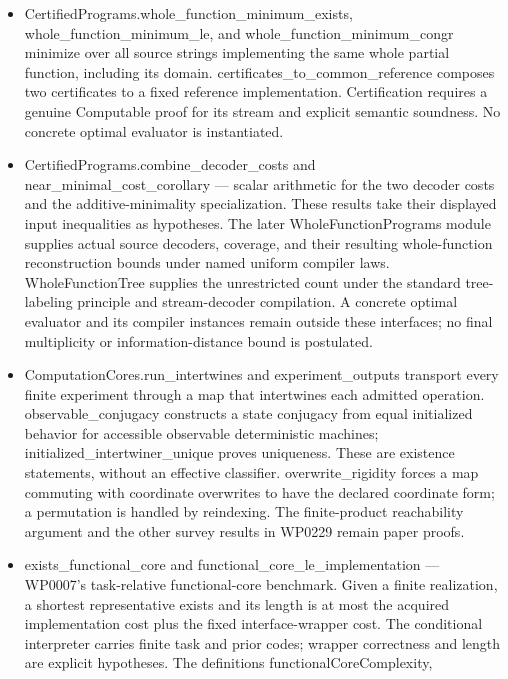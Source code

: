 \documentclass[11pt,a4paper]{article}
\newcommand{\lean}[1]{{\ttfamily\small
  \let\leanunderscore\_\def\_{\leanunderscore\allowbreak}#1}}
\begin{document}
\begin{itemize}[leftmargin=1.4em,itemsep=1pt]
to each candidate cannot increase cardinality.
\item \lean{CertifiedPrograms.whole\_function\_minimum\_exists},
\lean{whole\_function\_minimum\_le}, and \lean{whole\_function\_minimum\_congr}
minimize over all source strings implementing the same whole partial function, including its
domain. \lean{certificates\_to\_common\_reference} composes two certificates to a fixed
reference implementation. \lean{Certification} requires a genuine \lean{Computable} proof
for its stream and explicit semantic soundness. No concrete optimal evaluator is instantiated.
\item \lean{CertifiedPrograms.combine\_decoder\_costs} and
\lean{near\_minimal\_cost\_corollary} --- scalar arithmetic for the two decoder costs and
the additive-minimality specialization. These results take their displayed input inequalities
as hypotheses. The later \lean{WholeFunctionPrograms} module supplies actual source decoders,
coverage, and their resulting whole-function reconstruction bounds under named uniform compiler
laws. \lean{WholeFunctionTree} supplies the unrestricted count under the standard tree-labeling
principle and stream-decoder compilation. A concrete optimal evaluator and its compiler instances
remain outside these interfaces; no final multiplicity or information-distance bound is postulated.
\par\endgroup
\item \lean{ComputationCores.run\_intertwines} and \lean{experiment\_outputs}
transport every finite experiment through a map that intertwines each admitted operation.
\lean{observable\_conjugacy} constructs a state conjugacy from equal initialized behavior
for accessible observable deterministic machines; \lean{initialized\_intertwiner\_unique}
proves uniqueness. These are existence statements, without an effective classifier.
\lean{overwrite\_rigidity} forces a map commuting with coordinate overwrites to have the
declared coordinate form; a permutation is handled by reindexing. The finite-product
reachability argument and the other survey results in WP0229 remain paper proofs.
\item \lean{exists\_functional\_core} and
\lean{functional\_core\_le\_implementation} --- WP0007's task-relative
functional-core benchmark. Given a finite realization, a shortest representative exists and
its length is at most the acquired implementation cost plus the fixed interface-wrapper cost.
The conditional interpreter carries finite task and prior codes; wrapper correctness and
length are explicit hypotheses. The definitions \lean{functionalCoreComplexity},

\end{itemize}
\end{document}
